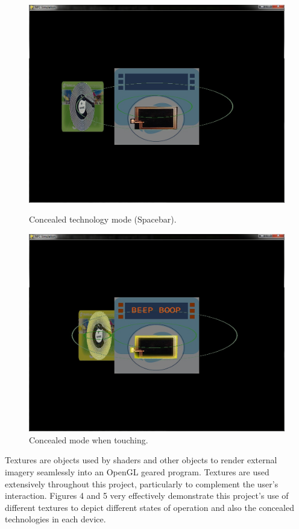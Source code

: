 \documentclass[a4paper]{article}
\begin{document}
\begin{figure}[!ht]
  \centering
  \begin{minipage}[b]{0.49\textwidth}
    \includegraphics[width=\textwidth]{4.jpg}
    \caption{Concealed technology mode (Spacebar).}
  \end{minipage}
  \hfill
  \begin{minipage}[b]{0.49\textwidth}
    \includegraphics[width=\textwidth]{5.jpg}
    \caption{Concealed mode when touching.}
  \end{minipage}
\end{figure}

Textures are objects used by shaders and other objects to render external imagery seamlessly into an OpenGL geared program. Textures are used extensively throughout this project, particularly to complement the user's interaction. Figures 4 and 5 very effectively demonstrate this project's use of different textures to depict different states of operation and also the concealed technologies in each device. 
\end{document}
